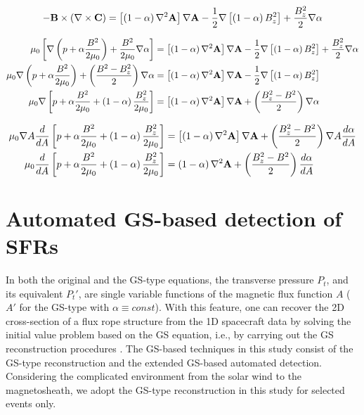 \begin{equation}
    -\mathbf{B}\times\left( \nabla \times\mathbf{C} \right) = \left[ \left( 1-\alpha \right)\nabla^2\mathbf{A} \right] \nabla\mathbf{A} - \frac{1}{2}\nabla\left[ \left( 1-\alpha \right)B_z^2 \right] + \frac{B_z^2}{2}\nabla\alpha
\end{equation}

\begin{equation}
    \begin{split}
        \mu_0\left[ \nabla\left( p + \alpha\frac{B^2}{2\mu_0} \right) + \frac{B^2}{2\mu_0}\nabla\alpha \right]  &= \left[ \left( 1-\alpha \right)\nabla^2\mathbf{A} \right] \nabla\mathbf{A} - \frac{1}{2}\nabla\left[ \left( 1-\alpha \right)B_z^2 \right] + \frac{B_z^2}{2}\nabla\alpha \\
        \mu_0\nabla\left( p + \alpha\frac{B^2}{2\mu_0} \right) + \left( \frac{B^2-B_z^2}{2} \right)\nabla\alpha  &= \left[ \left( 1-\alpha \right)\nabla^2\mathbf{A} \right]\nabla\mathbf{A} - \frac{1}{2}\nabla\left[ \left( 1-\alpha \right)B_z^2 \right] \\
        \mu_0\nabla\left[ p + \alpha\frac{B^2}{2\mu_0} + \left( 1-\alpha \right)\frac{B_z^2}{2\mu_0} \right] &= \left[ \left( 1-\alpha \right)\nabla^2\mathbf{A} \right]\nabla\mathbf{A} + \left( \frac{B_z^2-B^2}{2} \right)\nabla\alpha \\
    \end{split}
\end{equation}

\begin{equation}
    \begin{split}
        \mu_0\nabla A\frac{d}{d A}\left[ p + \alpha\frac{B^2}{2\mu_0} + \left( 1-\alpha \right)\frac{B_z^2}{2\mu_0} \right] &= \left[ \left( 1-\alpha \right)\nabla^2\mathbf{A} \right]\nabla\mathbf{A} + \left( \frac{B_z^2-B^2}{2} \right)\nabla A \frac{d\alpha}{d A} \\
        \mu_0\frac{d}{d A}\left[ p + \alpha\frac{B^2}{2\mu_0} + \left( 1-\alpha \right)\frac{B_z^2}{2\mu_0} \right] &= \left( 1-\alpha \right)\nabla^2\mathbf{A} + \left( \frac{B_z^2-B^2}{2} \right)\frac{d\alpha}{d A} \\
    \end{split}
\end{equation}

\section{Automated GS-based detection of SFRs}
In both the original and the GS-type equations, the transverse pressure $P_t$, and its equivalent $P_t'$, are single variable functions of the magnetic flux function $A$ ($A'$ for the GS-type with $\alpha\equiv const$). With this feature, one can recover the 2D cross-section of a flux rope structure from the 1D spacecraft data by solving the initial value problem based on the GS equation, i.e., by carrying out the GS reconstruction procedures \citep{Hau:1999, HuSonnerup:2002, Hu:2017}. The GS-based techniques in this study consist of the GS-type reconstruction and the extended GS-based automated detection. Considering the complicated environment from the solar wind to the magnetosheath, we adopt the GS-type reconstruction in this study for selected events only.

